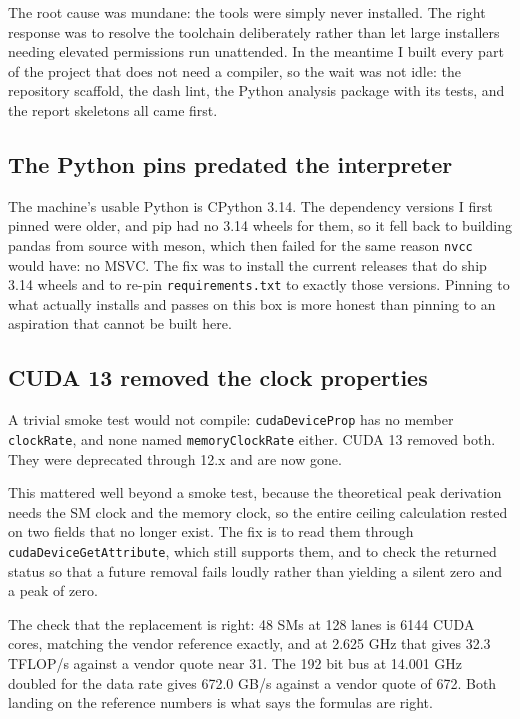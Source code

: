 ﻿\documentclass[11pt]{article}
\begin{document}
The root cause was mundane: the tools were simply never installed. The right
response was to resolve the toolchain deliberately rather than let large
installers needing elevated permissions run unattended. In the meantime
I built every part of the project that does not need a compiler, so the wait was
not idle: the repository scaffold, the dash lint, the Python analysis package
with its tests, and the report skeletons all came first.

\subsection{The Python pins predated the interpreter}

The machine's usable Python is CPython 3.14. The dependency versions I first
pinned were older, and pip had no 3.14 wheels for them, so it fell back to
building pandas from source with meson, which then failed for the same reason
\texttt{nvcc} would have: no MSVC. The fix was to install the current releases
that do ship 3.14 wheels and to re-pin \texttt{requirements.txt} to exactly those
versions. Pinning to what actually installs and passes on this box is more honest
than pinning to an aspiration that cannot be built here.

\subsection{CUDA 13 removed the clock properties}

A trivial smoke test would not compile: \texttt{cudaDeviceProp} has no member
\texttt{clockRate}, and none named \texttt{memoryClockRate} either. CUDA 13
removed both. They were deprecated through 12.x and are now gone.

This mattered well beyond a smoke test, because the theoretical peak derivation
needs the SM clock and the memory clock, so the entire ceiling calculation rested
on two fields that no longer exist. The fix is to read them through
\texttt{cudaDeviceGetAttribute}, which still supports them, and to check the
returned status so that a future removal fails loudly rather than yielding a
silent zero and a peak of zero.

The check that the replacement is right: 48 SMs at 128 lanes is 6144 CUDA cores,
matching the vendor reference exactly, and at 2.625 GHz that gives 32.3 TFLOP/s
against a vendor quote near 31. The 192 bit bus at 14.001 GHz doubled for the
data rate gives 672.0 GB/s against a vendor quote of 672. Both landing on the
reference numbers is what says the formulas are right.
\end{document}
